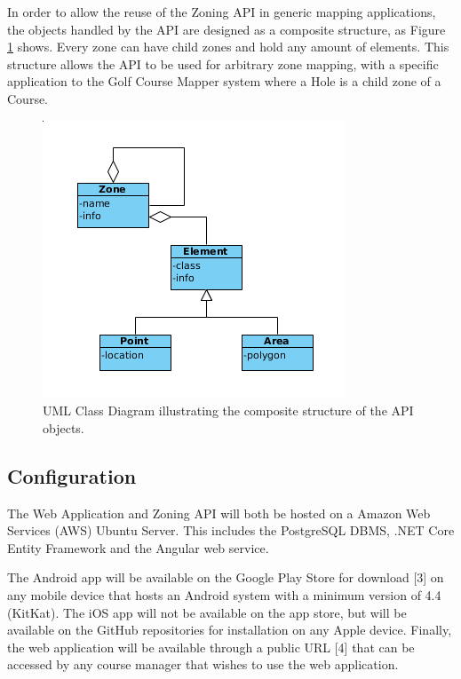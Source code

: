 \documentclass{article}
\begin{document}
    In order to allow the reuse of the Zoning API in generic mapping
    applications, the objects handled by the API are designed as a composite
    structure, as Figure \ref{fig:composite} shows. Every zone can have child
    zones and hold any amount of elements. This structure allows the API to be
    used for arbitrary zone mapping, with a specific application to the Golf
    Course Mapper system where a Hole is a child zone of a Course.

    \begin{center}
        \begin{figure}[H]
            \centering
            \includegraphics[scale=0.6]{Composite}
            \caption{UML Class Diagram illustrating the composite structure of
                the API objects.}
            \label{fig:composite}
        \end{figure}
    \end{center}

    \subsection{Configuration}

    The Web Application and Zoning API will both be hosted on a Amazon Web
    Services (AWS) Ubuntu Server. This includes the PostgreSQL DBMS, .NET Core
    Entity Framework and the Angular web service.

    The Android app will be available on the Google Play Store for download
    [3] on any mobile device that hosts an Android system with a minimum
    version of 4.4 (KitKat). The iOS app will not be available on the app
    store, but will be available on the GitHub repositories for installation on
    any Apple device. Finally, the web application will be available through a
    public URL [4] that can be accessed by any course manager that wishes to
    use the web application.
\end{document}
